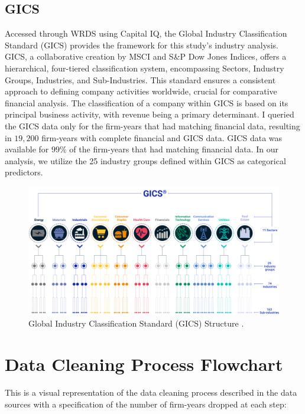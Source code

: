 \subsection{GICS}
 Accessed through WRDS using Capital IQ, the Global Industry Classification Standard (GICS) provides the framework for this study's industry analysis. GICS, a collaborative creation by MSCI and S\&P Dow Jones Indices, offers a hierarchical, four-tiered classification system, encompassing Sectors, Industry Groups, Industries, and Sub-Industries. This standard ensures a consistent approach to defining company activities worldwide, crucial for comparative financial analysis. The classification of a company within GICS is based on its principal business activity, with revenue being a primary determinant. I queried the GICS data only for the firm-years that had matching financial data, resulting in $19,200$ firm-years with complete financial and GICS data. GICS data was available for $99\%$ of the firm-years that had matching financial data. In our analysis, we utilize the 25 industry groups defined within GICS as categorical predictors.
 
\begin{figure}[H]
\begin{center}
\includegraphics[width=5in]{figures/gics.png}
\caption{Global Industry Classification Standard (GICS) Structure \cite{GICS_MSCI}.}
\label{fig:label1}
\end{center}
\end{figure}

\section{Data Cleaning Process Flowchart}
\label{sec:data-cleaning-process-flowchart}

\noindent This is a visual representation of the data cleaning process described in the data sources with a specification of the number of firm-years dropped at each step: 

